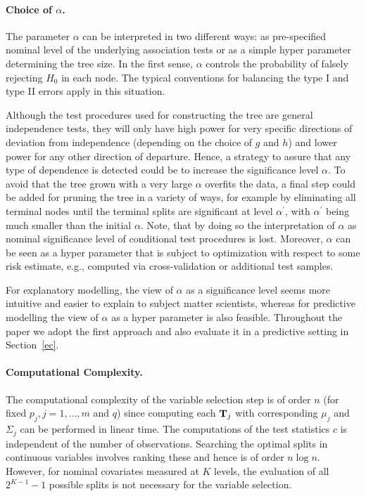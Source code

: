 \paragraph{Choice of $\alpha$.} 

The parameter $\alpha$ can be interpreted in
two different ways: as pre-specified nominal level of the
underlying association tests or as a simple hyper parameter determining the 
tree size. In the first sense, $\alpha$ controls the probability of falsely 
rejecting $H_0$ in each node. The typical conventions for balancing the type
I and type II errors apply in this situation. 

Although the test procedures used for constructing the tree are
general independence tests, they will only have high power for very
specific directions of deviation from independence (depending on the
choice of $g$ and $h$) and lower power for any other direction
of departure. Hence, a strategy to assure that any type of dependence is 
detected could be to increase the significance level $\alpha$. 
To avoid that the tree grown with a very large $\alpha$ overfits the data, 
a final step could be added for pruning the tree in a variety of ways,
for example by eliminating all terminal nodes until the terminal splits 
are significant at level $\alpha^\prime$,
with $\alpha^\prime$ being much smaller than the initial $\alpha$. 
Note, that by 
doing so the interpretation of $\alpha$ as nominal significance level
of conditional test procedures is lost. Moreover, $\alpha$ can be seen
as a hyper parameter that is subject to optimization with respect
to some risk estimate, e.g., computed via cross-validation
or additional test samples.

For explanatory modelling, the view of $\alpha$ as a significance level
seems more intuitive and easier to explain to subject matter
scientists, whereas for predictive modelling the view of $\alpha$ as a
hyper parameter is also feasible. Throughout the paper we adopt the
first approach and also evaluate it in a predictive setting in
Section~\ref{ec}.

\paragraph{Computational Complexity.}

The computational complexity of the variable selection step
is of order $n$ (for fixed
$p_j, j = 1, \dots, m$ and $q$) since
computing each $\mathbf{T}_j$ with corresponding $\mu_j$ and $\Sigma_j$ can be
performed in linear time. The computations of the test statistics $c$ is
independent of the number of observations. 
Searching the optimal splits in continuous variables involves ranking
these and hence is of order $n\log n$.
However, for nominal covariates measured at $K$ levels, 
the evaluation of all $2^{K-1} - 1$ possible splits is not necessary 
for the variable selection.


